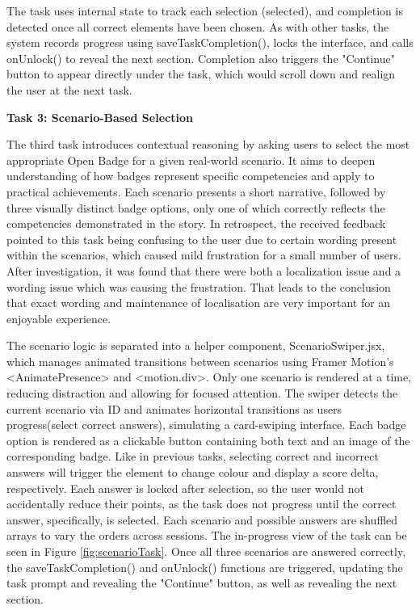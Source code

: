 The task uses internal state to track each selection (selected), and completion is detected once all correct elements have been chosen. 
As with other tasks, the system records progress using saveTaskCompletion(), locks the interface, and calls onUnlock() to reveal the next section.
Completion also triggers the "Continue" button to appear directly under the task, which would scroll down and realign the user at the next task.

 
\textbf{Task 3: Scenario-Based Selection}

The third task introduces contextual reasoning by asking users to select the most appropriate Open Badge for a given real-world scenario. 
It aims to deepen understanding of how badges represent specific competencies and apply to practical achievements. 
Each scenario presents a short narrative, followed by three visually distinct badge options, only one of which correctly reflects the competencies demonstrated in the story.
In retrospect, the received feedback pointed to this task being confusing to the user due to certain wording present within the scenarios, which caused mild frustration for a small number of users. 
After investigation, it was found that there were both a localization issue and a wording issue which was causing the frustration.
That leads to the conclusion that exact wording and maintenance of localisation are very important for an enjoyable experience.

The scenario logic is separated into a helper component, ScenarioSwiper.jsx, which manages animated transitions between scenarios using Framer Motion's <AnimatePresence> and <motion.div>. 
Only one scenario is rendered at a time, reducing distraction and allowing for focused attention. 
The swiper detects the current scenario via ID and animates horizontal transitions as users progress(select correct answers), simulating a card-swiping interface. 
Each badge option is rendered as a clickable button containing both text and an image of the corresponding badge. 
Like in previous tasks, selecting correct and incorrect answers will trigger the element to change colour and display a score delta, respectively. 
Each answer is locked after selection, so the user would not accidentally reduce their points, as the task does not progress until the correct answer, specifically, is selected.
Each scenario and possible answers are shuffled arrays to vary the orders across sessions. 
The in-progress view of the task can be seen in Figure \ref{fig:scenarioTask}. 
Once all three scenarios are answered correctly, the saveTaskCompletion() and onUnlock() functions are triggered, updating the task prompt and revealing the "Continue" button, as well as revealing the next section.


